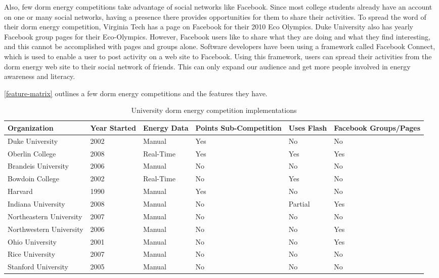 Also, few dorm energy competitions take advantage of social networks like Facebook.  Since most college students already have an account on one or many social networks, having a presence there provides opportunities for them to share their activities.  To spread the word of their dorm energy competition, Virginia Tech has a page on Facebook for their 2010 Eco Olympics\cite{vt-facebook}.  Duke University also has yearly Facebook group pages for their Eco-Olympics\cite{duke-facebook}.  However, Facebook users like to share what they are doing and what they find interesting, and this cannot be accomplished with pages and groups alone.  Software developers have been using a framework called Facebook Connect, which is used to enable a user to post activity on a web site to Facebook.  Using this framework, users can spread their activities from the dorm energy web site to their social network of friends.  This can only expand our audience and get more people involved in energy awareness and literacy.

\autoref{feature-matrix} outlines a few dorm energy competitions and the features they have.

\begin{table}[h]
	\begin{tabular}{| l || p{2cm} | p{2cm} | p{2cm} | p{2cm} | p{2cm} }
		\hline
		Organization & Year Started & Energy Data & Points Sub-Competition & Uses Flash & Facebook Groups/Pages \\
		\hline
		Duke University & 2002 & Manual & Yes & No & No \\
		Oberlin College & 2008 & Real-Time & Yes & Yes & Yes\\
		Brandeis University & 2006 & Manual & No & No & No\\
		Bowdoin College & 2002 & Real-Time & No & Yes & No\\
		Harvard & 1990 & Manual & Yes & No & No\\
		Indiana University & 2008 & Manual & No & Partial & Yes\\
		Northeastern University & 2007\cite{northeastern-first} & Manual & No & No & No\\
		Northwestern University & 2006\cite{northwestern-first} & Manual & No & No & Yes \\
		Ohio University & 2001\cite{ohio-first} & Manual & No & No & Yes\\
		Rice University & 2007\cite{rice-first} & Manual & No & No & No\\
		Stanford University & 2005\cite{stanford-energybowl} & Manual & No & No & No \\
		\hline
	\end{tabular}
	\caption{University dorm energy competition implementations}
	\label{feature-matrix}
\end{table}

